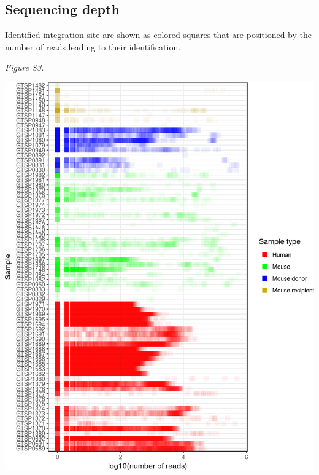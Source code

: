 \documentclass[12pt,]{article}
\begin{document}
\newpage

\subsection{Sequencing depth}\label{sequencing-depth}

Identified integration site are shown as colored squares that are
positioned by the number of reads leading to their identification.

\emph{Figure S3.}

\includegraphics{project_files/figure-latex/FigS3-1.png}
\end{document}
